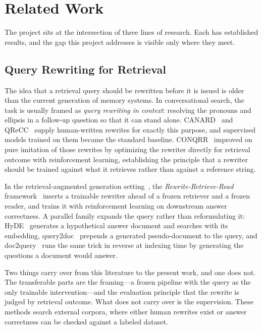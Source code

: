 \documentclass[12pt,letterpaper,oneside]{report}
\begin{document}
\section{Related Work}
\label{sec:related}

The project sits at the intersection of three lines of research. Each has
established results, and the gap this project addresses is visible only where
they meet.

\subsection{Query Rewriting for Retrieval}
\label{sec:related-rewriting}

The idea that a retrieval query should be rewritten before it is issued is
older than the current generation of memory systems. In conversational search,
the task is usually framed as \emph{query rewriting in context}: resolving the
pronouns and ellipsis in a follow-up question so that it can stand alone.
CANARD~\cite{canard} and QReCC~\cite{qrecc} supply human-written rewrites for
exactly this purpose, and supervised models trained on them became the standard
baseline. CONQRR~\cite{conqrr} improved on pure imitation of those rewrites by
optimizing the rewriter directly for retrieval outcome with reinforcement
learning, establishing the principle that a rewriter should be trained against
what it retrieves rather than against a reference string.

In the retrieval-augmented generation setting~\cite{rag}, the
\emph{Rewrite-Retrieve-Read} framework~\cite{rrr} inserts a trainable rewriter
ahead of a frozen retriever and a frozen reader, and trains it with
reinforcement learning on downstream answer correctness. A parallel family
expands the query rather than reformulating it: HyDE~\cite{hyde} generates a
hypothetical answer document and searches with its embedding,
query2doc~\cite{query2doc} prepends a generated pseudo-document to the query,
and doc2query~\cite{doc2query} runs the same trick in reverse at indexing time
by generating the questions a document would answer.

Two things carry over from this literature to the present work, and one does
not. The transferable parts are the framing---a frozen pipeline with the query
as the only trainable intervention---and the evaluation principle that the
rewrite is judged by retrieval outcome. What does not carry over is the
supervision. These methods search external corpora, where either human rewrites
exist or answer correctness can be checked against a labeled dataset.
\end{document}
